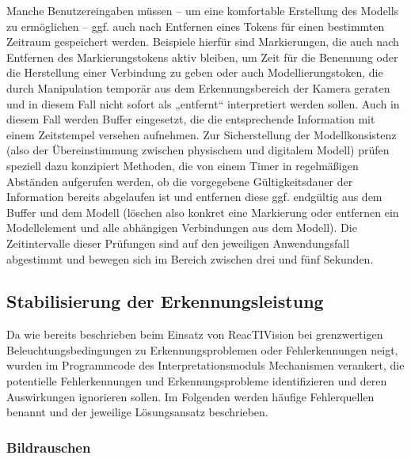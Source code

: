Manche Benutzereingaben müssen -- um eine komfortable Erstellung des Modells zu ermöglichen -- ggf. auch nach Entfernen eines Tokens für einen bestimmten Zeitraum gespeichert werden. Beispiele hierfür sind Markierungen, die auch nach Entfernen des Markierungstokens aktiv bleiben, um Zeit für die Benennung oder die Herstellung einer Verbindung zu geben oder auch Modellierungstoken, die durch Manipulation temporär aus dem Erkennungsbereich der Kamera geraten und in diesem Fall nicht sofort als „entfernt“ interpretiert werden sollen. Auch in diesem Fall werden Buffer eingesetzt, die die entsprechende Information mit einem Zeitstempel versehen aufnehmen. Zur Sicherstellung der Modellkonsistenz (also der Übereinstimmung zwischen physischem und digitalem Modell) prüfen speziell dazu konzipiert Methoden, die von einem Timer in regelmäßigen Abständen aufgerufen werden, ob die vorgegebene Gültigkeitsdauer der Information bereits abgelaufen ist und entfernen diese ggf. endgültig aus dem Buffer und dem Modell (löschen also konkret eine Markierung oder entfernen ein Modellelement und alle abhängigen Verbindungen aus dem Modell). Die Zeitintervalle dieser Prüfungen sind auf den jeweiligen Anwendungsfall abgestimmt und bewegen sich im Bereich zwischen drei und fünf Sekunden.


\subsection{Stabilisierung der Erkennungsleistung} %
\label{sub:stabilisierung_der_erkennungsleistung}

Da wie bereits beschrieben beim Einsatz von ReacTIVision bei grenzwertigen Beleuchtungsbedingungen zu Erkennungsproblemen oder Fehlerkennungen neigt, wurden im Programmcode des Interpretationsmoduls Mechanismen verankert, die potentielle Fehlerkennungen und Erkennungsprobleme identifizieren und deren Auswirkungen ignorieren sollen. Im Folgenden werden häufige Fehlerquellen benannt und der jeweilige Lösungsansatz beschrieben.

\subsubsection{Bildrauschen} %
\label{ssub:bildrauschen}

